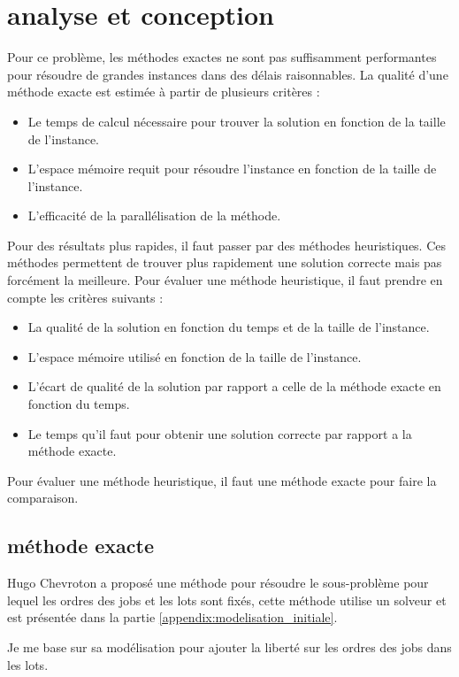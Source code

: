 \chapter{analyse et conception}

Pour ce problème, les méthodes exactes ne sont pas suffisamment performantes pour résoudre de grandes instances dans des délais raisonnables.
La qualité d'une méthode exacte est estimée à partir de plusieurs critères :
\begin{itemize}
	\item Le temps de calcul nécessaire pour trouver la solution en fonction de la taille de l'instance.
	\item L'espace mémoire requit pour résoudre l'instance en fonction de la taille de l'instance.
	\item L'efficacité de la parallélisation de la méthode.
\end{itemize}
Pour des résultats plus rapides, il faut passer par des méthodes heuristiques.
Ces méthodes permettent de trouver plus rapidement une solution correcte mais pas forcément la meilleure.
Pour évaluer une méthode heuristique, il faut prendre en compte les critères suivants :
\begin{itemize}
	\item La qualité de la solution en fonction du temps et de la taille de l'instance.
	\item L'espace mémoire utilisé en fonction de la taille de l'instance.
	\item L'écart de qualité de la solution par rapport a celle de la méthode exacte en fonction du temps.
	\item Le temps qu'il faut pour obtenir une solution correcte par rapport a la méthode exacte.
\end{itemize}
Pour évaluer une méthode heuristique, il faut une méthode exacte pour faire la comparaison.

\section{méthode exacte}
\label{section:analyse:methode_exacte}
Hugo Chevroton a proposé une méthode pour résoudre le sous-problème pour lequel les ordres des jobs et les lots sont fixés,
cette méthode utilise un solveur et est présentée dans la partie \autoref{appendix:modelisation_initiale}.

Je me base sur sa modélisation pour ajouter la liberté sur les ordres des jobs dans les lots.

